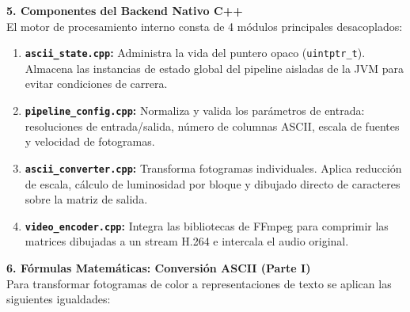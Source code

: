 \documentclass[12pt]{article}
\begin{document}
\newpage

\raggedright
{\Huge \bfseries 5. Componentes del Backend Nativo C++}\\[1cm]

\Large
El motor de procesamiento interno consta de 4 módulos principales desacoplados:

\begin{enumerate}
    \item \textbf{\texttt{ascii\_state.cpp}:}
    Administra la vida del puntero opaco (\texttt{uintptr\_t}). Almacena las instancias de estado global del pipeline aisladas de la JVM para evitar condiciones de carrera.

    \item \textbf{\texttt{pipeline\_config.cpp}:}
    Normaliza y valida los parámetros de entrada: resoluciones de entrada/salida, número de columnas ASCII, escala de fuentes y velocidad de fotogramas.

    \item \textbf{\texttt{ascii\_converter.cpp}:}
    Transforma fotogramas individuales. Aplica reducción de escala, cálculo de luminosidad por bloque y dibujado directo de caracteres sobre la matriz de salida.

    \item \textbf{\texttt{video\_encoder.cpp}:}
    Integra las bibliotecas de FFmpeg para comprimir las matrices dibujadas a un stream H.264 e intercala el audio original.
\end{enumerate}

\newpage

{\Huge \bfseries 6. Fórmulas Matemáticas: Conversión ASCII (Parte I)}\\[0.8cm]

\Large
Para transformar fotogramas de color a representaciones de texto se aplican las siguientes igualdades:
\end{document}
